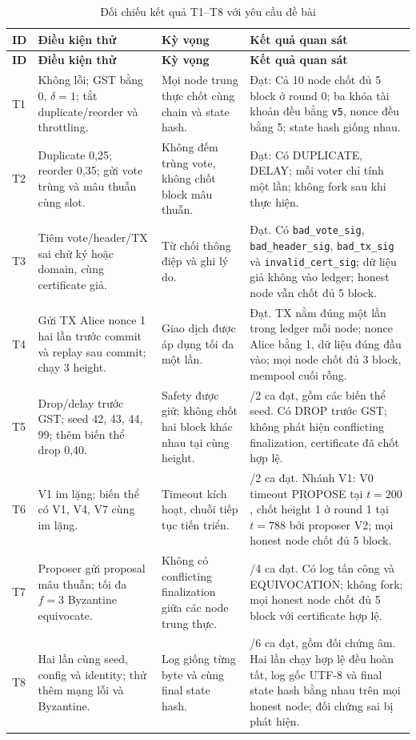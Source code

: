 \begingroup
\small
\setlength{\tabcolsep}{4pt}
\renewcommand{\arraystretch}{1.12}
\begin{longtable}{@{}p{0.55cm}>{\raggedright\arraybackslash}p{3.15cm}>{\raggedright\arraybackslash}p{4.1cm}>{\raggedright\arraybackslash}p{6.2cm}@{}}
\caption{Đối chiếu kết quả T1--T8 với yêu cầu đề bài}
\label{tab:test-matrix}\\
\toprule
\textbf{ID} & \textbf{Điều kiện thử} & \textbf{Kỳ vọng } & \textbf{Kết quả quan sát} \\
\midrule
\endfirsthead
\toprule
\textbf{ID} & \textbf{Điều kiện thử} & \textbf{Kỳ vọng } & \textbf{Kết quả quan sát} \\
\midrule
\endhead
\bottomrule
\endfoot
T1 & Không lỗi; GST bằng 0, $\delta=1$; tắt duplicate/reorder và throttling. & Mọi node trung thực chốt cùng chain và state hash. & Đạt: Cả 10 node chốt đủ 5 block ở round 0; ba khóa tài khoản đều bằng \texttt{v5}, nonce đều bằng 5; state hash giống nhau. \\
\midrule
T2 & Duplicate 0,25; reorder 0,35; gửi vote trùng và mâu thuẫn cùng slot. & Không đếm trùng vote, không chốt block mâu thuẫn. & Đạt: Có DUPLICATE, DELAY; mỗi voter chỉ tính một lần; không fork sau khi thực hiện. \\
\midrule
T3 & Tiêm vote/header/TX sai chữ ký hoặc domain, cùng certificate giả. & Từ chối thông điệp và ghi lý do. & Đạt. Có \texttt{bad\_vote\_sig}, \texttt{bad\_header\_sig}, \texttt{bad\_tx\_sig} và \texttt{invalid\_cert\_sig}; dữ liệu giả không vào ledger; honest node vẫn chốt đủ 5 block. \\
\midrule
T4 & Gửi TX Alice nonce 1 hai lần trước commit và replay sau commit; chạy 3 height. & Giao dịch được áp dụng tối đa một lần. & Đạt. TX nằm đúng một lần trong ledger mỗi node; nonce Alice bằng 1, dữ liệu đúng đầu vào; mọi node chốt đủ 3 block, mempool cuối rỗng. \\
\midrule
T5 & Drop/delay trước GST; seed 42, 43, 44, 99; thêm biến thể drop 0,40. & Safety được giữ; không chốt hai block khác nhau tại cùng height. & 2/2 ca đạt, gồm các biến thể seed. Có DROP trước GST; không phát hiện conflicting finalization, certificate đã chốt hợp lệ. \\
\midrule
T6 & V1 im lặng; biến thể có V1, V4, V7 cùng im lặng. & Timeout kích hoạt, chuỗi tiếp tục tiến triển. & 2/2 ca đạt. Nhánh V1: V0 timeout PROPOSE tại $t=200$, chốt height 1 ở round 1 tại $t=788$ bởi proposer V2; mọi honest node chốt đủ 5 block. \\
\midrule
T7 & Proposer gửi proposal mâu thuẫn; tối đa $f=3$ Byzantine equivocate. & Không có conflicting finalization giữa các node trung thực. & 4/4 ca đạt. Có log tấn công và EQUIVOCATION; không fork; mọi honest node chốt đủ 5 block với certificate hợp lệ. \\
\midrule
T8 & Hai lần cùng seed, config và identity; thử thêm mạng lỗi và Byzantine. & Log giống từng byte và cùng final state hash. & 6/6 ca đạt, gồm đối chứng âm. Hai lần chạy hợp lệ đều hoàn tất, log gốc UTF-8 và final state hash bằng nhau trên mọi honest node; đối chứng sai bị phát hiện. \\
\end{longtable}
\endgroup

